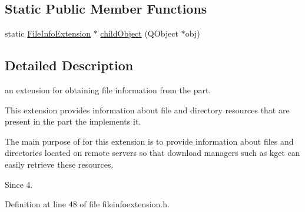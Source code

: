 \subsection*{\-Static \-Public \-Member \-Functions}
\begin{DoxyCompactItemize}
\item 
static \hyperlink{classKParts_1_1FileInfoExtension}{\-File\-Info\-Extension} $\ast$ \hyperlink{classKParts_1_1FileInfoExtension_a1c137505684c839e52edff6b3592a264}{child\-Object} (\-Q\-Object $\ast$obj)
\end{DoxyCompactItemize}


\subsection{\-Detailed \-Description}
an extension for obtaining file information from the part. 

\-This extension provides information about file and directory resources that are present in the part the implements it.

\-The main purpose of for this extension is to provide information about files and directories located on remote servers so that download managers such as kget can easily retrieve these resources.

\begin{DoxySince}{\-Since}
4. 
\end{DoxySince}


\-Definition at line 48 of file fileinfoextension.\-h.




